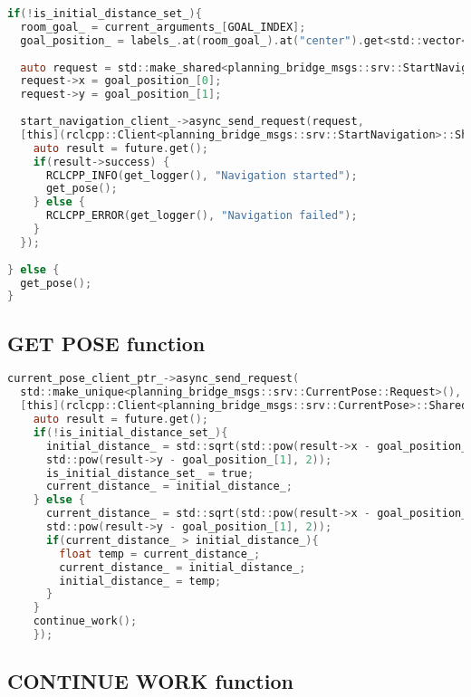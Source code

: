 \noindent\begin{lstlisting}[language=C, style=CStyle, caption={Starts navigation with the given goal coordinates}]
if(!is_initial_distance_set_){
  room_goal_ = current_arguments_[GOAL_INDEX];
  goal_position_ = labels_.at(room_goal_).at("center").get<std::vector<double>>();
  
  auto request = std::make_shared<planning_bridge_msgs::srv::StartNavigation::Request>();
  request->x = goal_position_[0];
  request->y = goal_position_[1];
  
  start_navigation_client_->async_send_request(request,
  [this](rclcpp::Client<planning_bridge_msgs::srv::StartNavigation>::SharedFuture future){
    auto result = future.get();
    if(result->success) {
      RCLCPP_INFO(get_logger(), "Navigation started");
      get_pose();
    } else {
      RCLCPP_ERROR(get_logger(), "Navigation failed");
    }
  });
  
} else {
  get_pose();
}
\end{lstlisting}

\subsection{GET POSE function}

\noindent\begin{lstlisting}[language=C, style=CStyle, caption={Asks pose and sets initial and current poses}]
current_pose_client_ptr_->async_send_request(
  std::make_unique<planning_bridge_msgs::srv::CurrentPose::Request>(),
  [this](rclcpp::Client<planning_bridge_msgs::srv::CurrentPose>::SharedFuture future) {
    auto result = future.get();
    if(!is_initial_distance_set_){
      initial_distance_ = std::sqrt(std::pow(result->x - goal_position_[0], 2) +
      std::pow(result->y - goal_position_[1], 2));
      is_initial_distance_set_ = true;
      current_distance_ = initial_distance_;
    } else {
      current_distance_ = std::sqrt(std::pow(result->x - goal_position_[0], 2) +
      std::pow(result->y - goal_position_[1], 2));
      if(current_distance_ > initial_distance_){
        float temp = current_distance_;
        current_distance_ = initial_distance_;
        initial_distance_ = temp;
      }
    }
    continue_work();
    });
\end{lstlisting}

\newpage

\subsection{CONTINUE WORK function}


